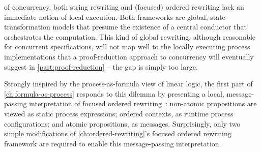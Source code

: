 


 of concurrency, both string rewriting and (focused) ordered rewriting lack an immediate notion of local execution.
Both frameworks are global, state-transformation models that presume the existence of a central conductor that orchestrates the computation.
This kind of global rewriting, although reasonable for concurrent specifications, will not map well to the locally executing process implementations that a proof-reduction approach to concurrency will eventually suggest in \cref{part:proof-reduction} -- the gap is simply too large.

Strongly inspired by the process-as-formula view of linear logic\autocites{Miller:ELP92}{Cervesato+Scedrov:IC09}, the first part of \cref{ch:formula-as-process} responds to this dilemma by presenting a local, message-passing interpretation of focused ordered rewriting~:
non-atomic propositions are viewed as static process expressions; ordered contexts, as runtime process configurations; and atomic propositions, as messages.
Surprisingly, only two simple modifications of \cref{ch:ordered-rewriting}'s focused ordered rewriting framework are required to enable this message-passing interpretation.

